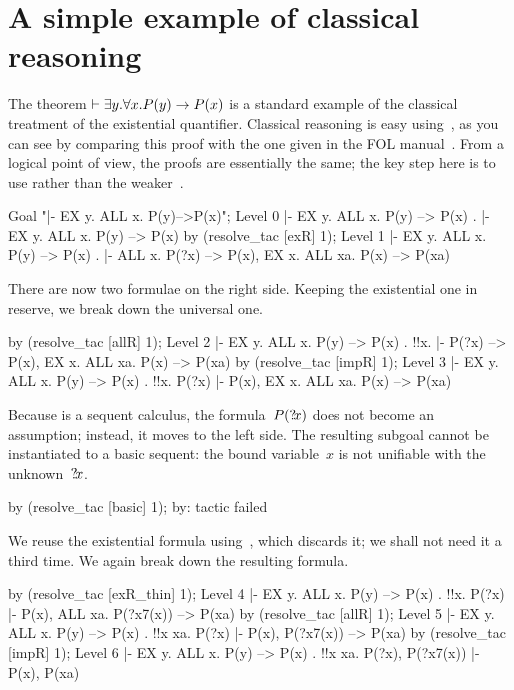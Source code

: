 \section{A simple example of classical reasoning} 
The theorem $\vdash\exists y.\forall x.P(y)\rightarrow P(x)$ is a standard example of the
classical treatment of the existential quantifier.  Classical reasoning
is easy using~{\LK}, as you can see by comparing this proof with the one
given in the FOL manual~\cite{isabelle-ZF}.  From a logical point of view, the
proofs are essentially the same; the key step here is to use 
rather than the weaker~.
\begin{ttbox}
Goal "|- EX y. ALL x. P(y)-->P(x)";
{\out Level 0}
{\out  |- EX y. ALL x. P(y) --> P(x)}
{.  |- EX y. ALL x. P(y) --> P(x)}
by (resolve_tac [exR] 1);
{\out Level 1}
{\out  |- EX y. ALL x. P(y) --> P(x)}
{.  |- ALL x. P(?x) --> P(x), EX x. ALL xa. P(x) --> P(xa)}
\end{ttbox}
There are now two formulae on the right side.  Keeping the existential one
in reserve, we break down the universal one.
\begin{ttbox}
by (resolve_tac [allR] 1);
{\out Level 2}
{\out  |- EX y. ALL x. P(y) --> P(x)}
{. !!x.  |- P(?x) --> P(x), EX x. ALL xa. P(x) --> P(xa)}
by (resolve_tac [impR] 1);
{\out Level 3}
{\out  |- EX y. ALL x. P(y) --> P(x)}
{. !!x. P(?x) |- P(x), EX x. ALL xa. P(x) --> P(xa)}
\end{ttbox}
Because {\LK} is a sequent calculus, the formula~$P({?\!x})$ does not
become an assumption;  instead, it moves to the left side.  The
resulting subgoal cannot be instantiated to a basic sequent: the bound
variable~$x$ is not unifiable with the unknown~${?\!x}$.
\begin{ttbox}
by (resolve_tac [basic] 1);
{\out by: tactic failed}
\end{ttbox}
We reuse the existential formula using~, which discards
it; we shall not need it a third time.  We again break down the resulting
formula.
\begin{ttbox}
by (resolve_tac [exR_thin] 1);
{\out Level 4}
{\out  |- EX y. ALL x. P(y) --> P(x)}
{. !!x. P(?x) |- P(x), ALL xa. P(?x7(x)) --> P(xa)}
by (resolve_tac [allR] 1);
{\out Level 5}
{\out  |- EX y. ALL x. P(y) --> P(x)}
{. !!x xa. P(?x) |- P(x), P(?x7(x)) --> P(xa)}
by (resolve_tac [impR] 1);
{\out Level 6}
{\out  |- EX y. ALL x. P(y) --> P(x)}
{. !!x xa. P(?x), P(?x7(x)) |- P(x), P(xa)}
\end{ttbox}
